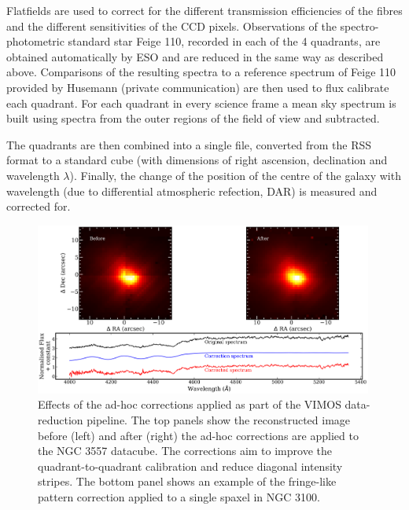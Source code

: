 		Flatfields are used to correct for the different transmission efficiencies of the fibres and the different sensitivities of the CCD pixels. Observations of the spectro-photometric standard star Feige 110, recorded in each of the 4 quadrants, are obtained automatically by ESO and are reduced in the same way as described above. Comparisons of the resulting spectra to a reference spectrum of Feige 110 provided by Husemann (private communication) are then used to flux calibrate each quadrant. For each quadrant in every science frame a mean sky spectrum is built using spectra from the outer regions of the field of view and subtracted.

		The quadrants are then combined into a single file, converted from the RSS format to a standard cube (with dimensions of right ascension, declination and wavelength $\lambda$). Finally, the change of the position of the centre of the galaxy with wavelength (due to differential atmospheric refection, DAR) is measured and corrected for. 

		\begin{figure}
			\centering
			\includegraphics[width=0.99\textwidth]{chapter2/corr_image.png}
			\caption[Ad-hoc correction to the VIMOS datacubes]{Effects of the ad-hoc corrections applied as part of the VIMOS data-reduction pipeline. The top panels show the reconstructed image before (left) and after (right) the ad-hoc corrections are applied to the NGC 3557 datacube. The corrections aim to improve the quadrant-to-quadrant calibration and reduce diagonal intensity stripes. The bottom panel shows an example of the fringe-like pattern correction applied to a single spaxel in NGC 3100.}
			\label{fig:Correction}
		\end{figure}

